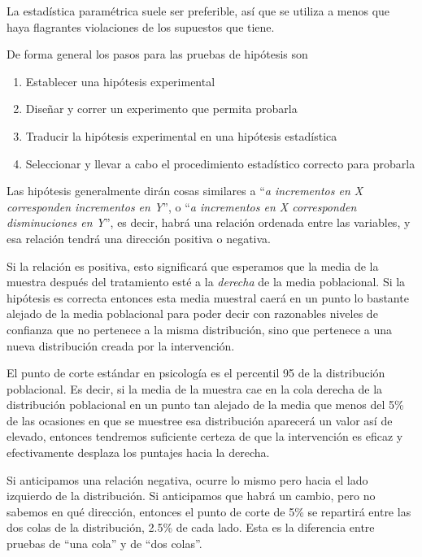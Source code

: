 \documentclass[a4paper,12pt]{article}
\begin{document}
La estadística paramétrica suele ser preferible, así que se utiliza a menos que haya flagrantes violaciones de los supuestos que tiene.

De forma general los pasos para las pruebas de hipótesis son
\begin{enumerate}
  \item Establecer una hipótesis experimental
  \item Diseñar y correr un experimento que permita probarla
  \item Traducir la hipótesis experimental en una hipótesis estadística
  \item Seleccionar y llevar a cabo el procedimiento estadístico correcto para probarla
\end{enumerate}

Las hipótesis generalmente dirán cosas similares a ``{\slshape a incrementos en X corresponden incrementos en Y}'', o ``{\slshape a incrementos en X corresponden disminuciones en Y}'', es decir, habrá una relación ordenada entre las variables, y esa relación tendrá una dirección positiva o negativa.

Si la relación es positiva, esto significará que esperamos que la media de la muestra después del tratamiento esté a la {\slshape derecha} de la media poblacional. Si la hipótesis es correcta entonces esta media muestral caerá en un punto lo bastante alejado de la media poblacional para poder decir con razonables niveles de confianza que no pertenece a la misma distribución, sino que pertenece a una nueva distribución creada por la intervención.

El punto de corte estándar en psicología es el percentil 95 de la distribución poblacional. Es decir, si la media de la muestra cae en la cola derecha de la distribución poblacional en un punto tan alejado de la media que menos del 5\% de las ocasiones en que se muestree esa distribución aparecerá un valor así de elevado, entonces tendremos suficiente certeza de que la intervención es eficaz y efectivamente desplaza los puntajes hacia la derecha.

Si anticipamos una relación negativa, ocurre lo mismo pero hacia el lado izquierdo de la distribución. Si anticipamos que habrá un cambio, pero no sabemos en qué dirección, entonces el punto de corte de 5\% se repartirá entre las dos colas de la distribución, 2.5\% de cada lado. Esta es la diferencia entre pruebas de ``una cola'' y de ``dos colas''.

\end{document}
